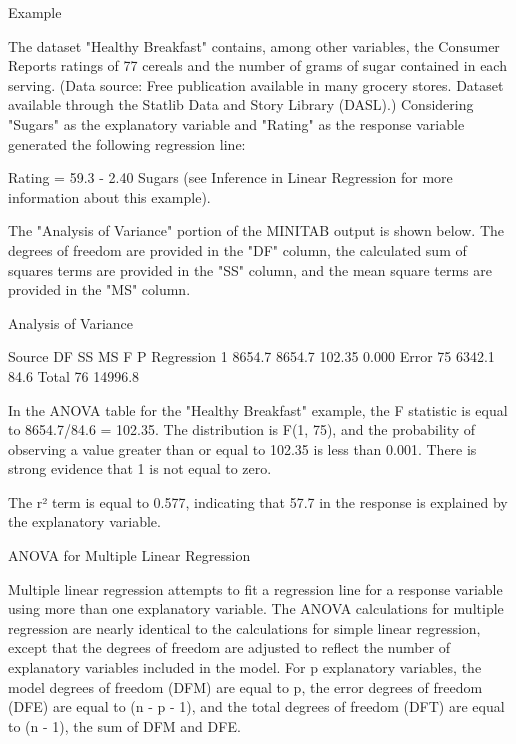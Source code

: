 Example


The dataset "Healthy Breakfast" contains, among other variables, 
the Consumer Reports ratings of 77 cereals and the number of grams 
of sugar contained in each serving. (Data source: Free publication 
available in many grocery stores. Dataset available through the 
Statlib Data and Story 
Library (DASL).) 
Considering "Sugars" as the explanatory 
variable and "Rating" as the response variable generated the following
regression line: 

Rating = 59.3 - 2.40 Sugars (see Inference in
Linear Regression for more information about this example).  

The "Analysis of Variance" portion of the MINITAB output is shown below.
The degrees of freedom are provided in the "DF" column, the calculated
sum of squares terms are provided in the "SS" column, and the mean
square terms are provided in the "MS" column.    
 

Analysis of Variance

Source       DF          SS          MS         F        P
Regression    1      8654.7      8654.7    102.35    0.000
Error        75      6342.1        84.6
Total        76     14996.8



In the ANOVA table for the "Healthy Breakfast" example, the F statistic
is equal to 8654.7/84.6 = 102.35.  The distribution is F(1, 75),
and the probability of observing a value greater than or equal to 102.35
is less than 0.001.  There is strong evidence that 
1 is not equal to zero.       


The r² term is equal to 0.577, indicating that 57.7%
in the response is explained by the explanatory variable.



ANOVA for Multiple Linear Regression



Multiple linear regression attempts to fit a regression line for 
a response variable using more than one explanatory variable.  The ANOVA calculations for
multiple regression are nearly identical to the calculations for simple linear regression, 
except that the degrees of freedom are adjusted to reflect the number of explanatory variables 
included in the model.  
For p explanatory variables,
the model degrees of freedom (DFM) are equal to p, the error degrees of
freedom (DFE) are equal to (n - p - 1), and the total degrees of freedom
(DFT) are equal to (n - 1), the sum of DFM and DFE.  

